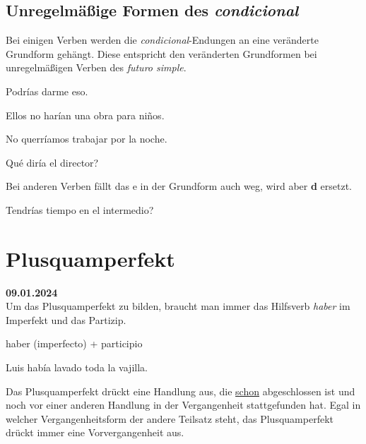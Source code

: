 \subsection*{Unregelmäßige Formen des \textit{condicional}}
Bei einigen Verben werden die \textit{condicional}-Endungen 
an eine veränderte Grundform gehängt. Diese entspricht den
veränderten Grundformen bei unregelmäßigen Verben des 
\textit{futuro simple}.
\begin{ejemplos}
    \item Podr\'ias darme eso.
    \item Ellos no har\'ian una obra para ni\~nos.
    \item No querr\'iamos trabajar por la noche.
    \item Qu\'e dir\'ia el director?
\end{ejemplos}
Bei anderen Verben fällt das e in der Grundform auch weg,
wird aber \textbf{d} ersetzt.
\begin{ejemplos}
    \item Tendr\'ias tiempo en el intermedio?
\end{ejemplos}
\section{Plusquamperfekt}
\textbf{09.01.2024}\\
Um das Plusquamperfekt zu bilden, braucht man immer das Hilfsverb
\textit{haber} im Imperfekt und das Partizip.
\begin{gramatica}
    \item haber (imperfecto) + participio
\end{gramatica}
\begin{ejemplos}
    \item Luis hab\'ia lavado toda la vajilla.
\end{ejemplos}
Das Plusquamperfekt drückt eine Handlung aus, die \underline{schon}
abgeschlossen ist und noch vor einer anderen Handlung in der
Vergangenheit stattgefunden hat. Egal in welcher Vergangenheitsform
der andere Teilsatz steht, das Plusquamperfekt drückt immer eine
Vorvergangenheit aus.
